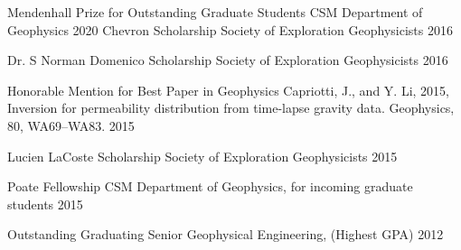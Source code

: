 




\begin{cvhonors}

  \cvhonor
    {Mendenhall Prize for Outstanding Graduate Students}
    {CSM Department of Geophysics}
    {}
    {2020}
  \cvhonor
    {Chevron Scholarship} %
    {Society of Exploration Geophysicists} %
    {} %
    {2016} %

  \cvhonor
    {Dr. S Norman Domenico Scholarship} %
    {Society of Exploration Geophysicists} %
    {} %
    {2016} %

  \cvhonor
    {Honorable Mention for Best Paper in Geophysics} %
    {Capriotti, J., and Y. Li, 2015, Inversion for permeability distribution from time-lapse gravity data. Geophysics, 80, WA69–WA83.} %
    {} %
    {2015} %

  \cvhonor
    {Lucien LaCoste Scholarship} %
    {Society of Exploration Geophysicists} %
    {} %
    {2015} %
    
  \cvhonor
    {Poate Fellowship} %
    {CSM Department of Geophysics, for incoming graduate students} %
    {} %
    {2015} %


  \cvhonor
    {Outstanding Graduating Senior} %
    {Geophysical Engineering, (Highest GPA)} %
    {} %
    {2012} %

\end{cvhonors}
